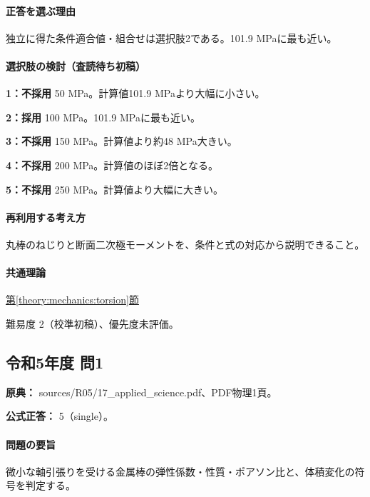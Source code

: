 \paragraph{正答を選ぶ理由} 独立に得た条件適合値・組合せは選択肢2である。101.9 MPaに最も近い。

\paragraph{選択肢の検討（査読待ち初稿）}

\noindent\textbf{1：不採用} 50 MPa。計算値101.9 MPaより大幅に小さい。\par

\noindent\textbf{2：採用} 100 MPa。101.9 MPaに最も近い。\par

\noindent\textbf{3：不採用} 150 MPa。計算値より約48 MPa大きい。\par

\noindent\textbf{4：不採用} 200 MPa。計算値のほぼ2倍となる。\par

\noindent\textbf{5：不採用} 250 MPa。計算値より大幅に大きい。\par

\paragraph{再利用する考え方} 丸棒のねじりと断面二次極モーメントを、条件と式の対応から説明できること。

\paragraph{共通理論} \hyperref[theory:mechanics:torsion]{第\ref*{theory:mechanics:torsion}節}

\par 難易度 2（校準初稿）、優先度未評価。

\subsection{令和5年度 問1}
\label{q:r05-reg-applied-01}

\noindent\textbf{原典：} sources/R05/17\_applied\_science.pdf、PDF物理1頁。

\textbf{公式正答：} 5（single）。

\paragraph{問題の要旨} 微小な軸引張りを受ける金属棒の弾性係数・性質・ポアソン比と、体積変化の符号を判定する。

